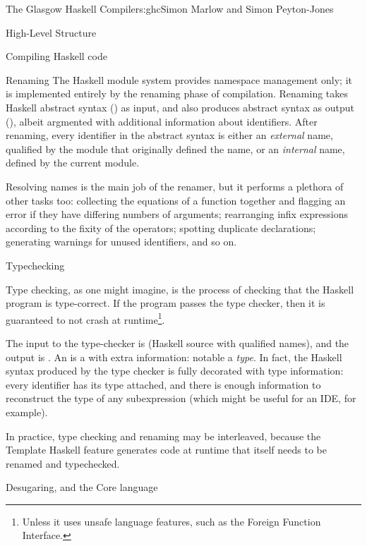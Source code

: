 \begin{aosachapter}{The Glasgow Haskell Compiler}{s:ghc}{Simon Marlow and Simon Peyton-Jones}
\begin{aosasect1}{High-Level Structure}
\begin{aosasect2}{Compiling Haskell code}
\begin{aosasect3}{Renaming}
The Haskell module system provides namespace management only; it is
implemented entirely by the renaming phase of compilation.  Renaming
takes Haskell abstract syntax () as input, and
also produces abstract syntax as output (), albeit
argmented with additional information about identifiers.  After
renaming, every identifier in the abstract syntax is either an
\emph{external} name, qualified by the module that originally defined
the name, or an \emph{internal} name, defined by the current module.

Resolving names is the main job of the renamer, but it performs a
plethora of other tasks too: collecting the equations of a function
together and flagging an error if they have differing numbers of
arguments; rearranging infix expressions according to the fixity of
the operators; spotting duplicate declarations; generating warnings
for unused identifiers, and so on.

\end{aosasect3}

\begin{aosasect3}{Typechecking}

Type checking, as one might imagine, is the process of checking that
the Haskell program is type-correct.  If the program passes the type
checker, then it is guaranteed to not crash at runtime\footnote{Unless
  it uses unsafe language features, such as the Foreign Function
  Interface.}.

The input to the type-checker is  (Haskell source
with qualified names), and the output is .  An
 is a  with extra information: notable a
\emph{type}.  In fact, the Haskell syntax produced by the type checker
is fully decorated with type information: every identifier has its
type attached, and there is enough information to reconstruct the type
of any subexpression (which might be useful for an IDE, for example).

In practice, type checking and renaming may be interleaved, because
the Template Haskell feature generates code at runtime that itself
needs to be renamed and typechecked.

\end{aosasect3}

\begin{aosasect3}{Desugaring, and the Core language}


\end{aosasect3}
\end{aosasect2}
\end{aosasect1}
\end{aosachapter}
